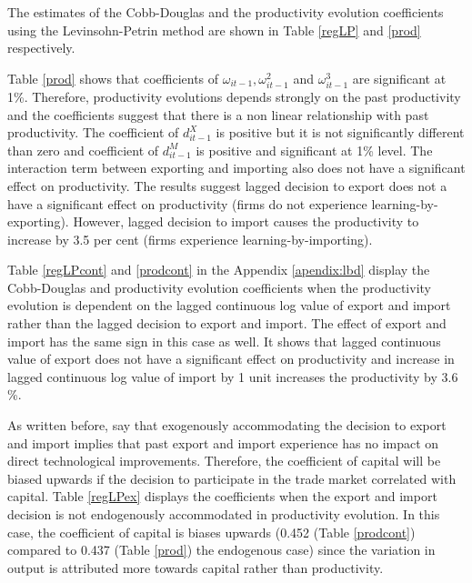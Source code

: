 \documentclass[12pt]{article}
\begin{document}
The estimates of the Cobb-Douglas and  the productivity evolution
coefficients  using the Levinsohn-Petrin
method are shown in Table \ref{regLP} and \ref{prod}  respectively. 

 
Table \ref{prod} shows that coefficients of $\omega_{it-1},
\omega_{it-1}^{2}$ and $\omega_{it-1}^{3}$ are significant at 1\%. Therefore, productivity evolutions depends strongly
on the past productivity and the coefficients suggest that there is a
non linear relationship with past
productivity. The coefficient of $d_{it-1}^{X}$ is positive but it is
not significantly different than zero and  coefficient of
$d_{it-1}^{M}$  is positive and significant at 1\% level. The
interaction term between exporting and importing also does not have a significant effect on productivity.
The results suggest lagged decision to export does not a have
a significant effect on productivity (firms do not experience learning-by-exporting). However, 
lagged decision to import causes the productivity to increase by 3.5  per
cent (firms experience learning-by-importing).  


Table \ref{regLPcont} and \ref{prodcont} in the Appendix \ref{apendix:lbd} display the Cobb-Douglas and
productivity evolution
coefficients  when the
productivity evolution is dependent on the lagged continuous log value of export
and import rather than the lagged decision to export and import.
The effect of export and import has the same sign in this case as
well. It shows that lagged
continuous value of export does not have a significant effect on
productivity and  increase in lagged continuous log value of import  by 1 unit
increases the productivity by 3.6 \%.  


As written before, \textcite{de2013detecting} say that exogenously accommodating the
decision to export and import implies that
past export and import experience has no impact on direct technological
improvements. Therefore, the coefficient of capital will be biased
upwards if the decision to participate in the trade market correlated with capital. Table
\ref{regLPex} displays the coefficients when the export and import
decision is not endogenously accommodated in 
productivity evolution. In this case, the coefficient of capital is
biases upwards (0.452 (Table \ref{prodcont}) compared to 0.437 (Table \ref{prod}) the endogenous case)  since
the variation in output is attributed more towards capital rather than productivity.   

\end{document}
